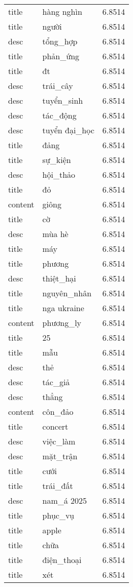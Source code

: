 \documentclass{article}
\begin{document}
\begin{tabular}{lll}
title & hàng nghìn & 6.8514\\
title & người & 6.8514\\
desc & tổng\_hợp & 6.8514\\
title & phản\_ứng & 6.8514\\
title & đt & 6.8514\\
desc & trái\_cây & 6.8514\\
desc & tuyển\_sinh & 6.8514\\
desc & tác\_động & 6.8514\\
desc & tuyển đại\_học & 6.8514\\
title & đảng & 6.8514\\
title & sự\_kiện & 6.8514\\
desc & hội\_thảo & 6.8514\\
title & đỏ & 6.8514\\
content & giông & 6.8514\\
title & cờ & 6.8514\\
desc & mùa hè & 6.8514\\
title & máy & 6.8514\\
title & phương & 6.8514\\
desc & thiệt\_hại & 6.8514\\
title & nguyên\_nhân & 6.8514\\
title & nga ukraine & 6.8514\\
content & phương\_ly & 6.8514\\
title & 25 & 6.8514\\
title & mẫu & 6.8514\\
desc & thẻ & 6.8514\\
desc & tác\_giả & 6.8514\\
desc & thẳng & 6.8514\\
content & côn\_đảo & 6.8514\\
title & concert & 6.8514\\
desc & việc\_làm & 6.8514\\
desc & mặt\_trận & 6.8514\\
title & cưới & 6.8514\\
title & trái\_đất & 6.8514\\
desc & nam\_á 2025 & 6.8514\\
title & phục\_vụ & 6.8514\\
title & apple & 6.8514\\
title & chữa & 6.8514\\
title & điện\_thoại & 6.8514\\
title & xét & 6.8514\\

\end{tabular}
\end{document}
